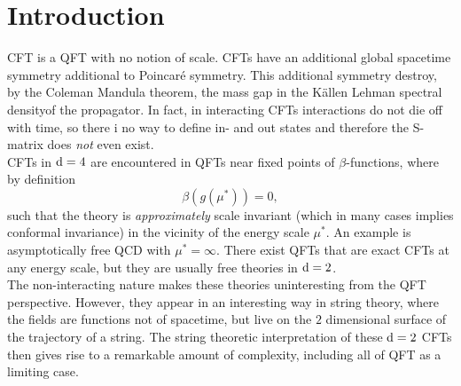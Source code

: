 \section{Introduction}
CFT is a QFT with no notion of scale. CFTs have an additional global spacetime symmetry additional to Poincaré symmetry. This additional symmetry destroy, by the Coleman Mandula theorem, the mass gap in the Källen Lehman spectral densityof the propagator. In fact, in interacting CFTs interactions do not die off with time, so there i no way to define in- and out states and therefore the S-matrix does \emph{not} even exist.\\
CFTs in $\mathrm{d}=4$ are encountered in QFTs near fixed points of $\beta$-functions, where by definition
\begin{equation*}
	\beta(g(\mu^*)) = 0,
\end{equation*}
such that the theory is \emph{approximately} scale invariant (which in many cases implies conformal invariance) in the vicinity of the energy scale $\mu^*$. An example is asymptotically free QCD with $\mu^*=\infty$. There exist QFTs that are exact CFTs at any energy scale, but they are usually free theories in $\mathrm{d}=2$.\\
The non-interacting nature makes these theories uninteresting from the QFT perspective. However, they appear in an interesting way in string theory, where the fields are functions not of spacetime, but live on the $2$ dimensional surface of the trajectory of a string. The string theoretic interpretation of these $\mathrm{d}=2$ CFTs then gives rise to a remarkable amount of complexity, including all of QFT as a limiting case.




